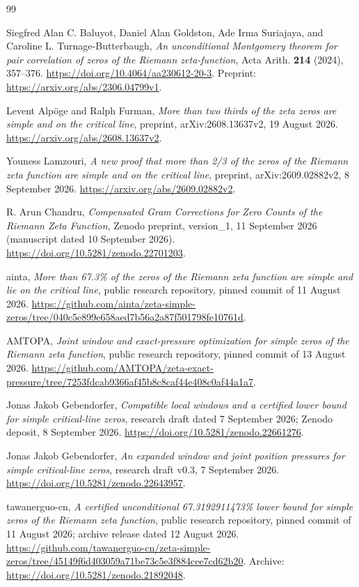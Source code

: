 \documentclass[11pt,reqno]{amsart}
\numberwithin{equation}{section}
\begin{document}
\begin{thebibliography}{99}
\raggedright

Siegfred Alan C. Baluyot, Daniel Alan Goldston, Ade Irma Suriajaya,
and Caroline L. Turnage-Butterbaugh,
\emph{An unconditional Montgomery theorem for pair correlation of zeros
of the Riemann zeta-function},
Acta Arith. \textbf{214} (2024), 357--376.
\url{https://doi.org/10.4064/aa230612-20-3}.
Preprint: \url{https://arxiv.org/abs/2306.04799v1}.

Levent Alp\"oge and Ralph Furman,
\emph{More than two thirds of the zeta zeros are simple and on the critical line},
preprint, arXiv:2608.13637v2, 19 August 2026.
\url{https://arxiv.org/abs/2608.13637v2}.

Youness Lamzouri,
\emph{A new proof that more than 2/3 of the zeros of the Riemann zeta
function are simple and on the critical line},
preprint, arXiv:2609.02882v2, 8 September 2026.
\url{https://arxiv.org/abs/2609.02882v2}.

R. Arun Chandru,
\emph{Compensated Gram Corrections for Zero Counts of the Riemann Zeta Function},
Zenodo preprint, version\_1, 11 September 2026
(manuscript dated 10 September 2026).
\url{https://doi.org/10.5281/zenodo.22701203}.

ainta,
\emph{More than 67.3\% of the zeros of the Riemann zeta function
are simple and lie on the critical line},
public research repository, pinned commit of 11 August 2026.
\url{https://github.com/ainta/zeta-simple-zeros/tree/040c5e899e658aed7b56a2a87f501798fe10761d}.

AMTOPA,
\emph{Joint window and exact-pressure optimization for simple zeros
of the Riemann zeta function},
public research repository, pinned commit of 13 August 2026.
\url{https://github.com/AMTOPA/zeta-exact-pressure/tree/7253fdcab9366af45b8c8caf44e408c0af44a1a7}.

Jonas Jakob Gebendorfer,
\emph{Compatible local windows and a certified lower bound
for simple critical-line zeros},
research draft dated 7 September 2026; Zenodo deposit, 8 September 2026.
\url{https://doi.org/10.5281/zenodo.22661276}.

Jonas Jakob Gebendorfer,
\emph{An expanded window and joint position pressures
for simple critical-line zeros},
research draft v0.3, 7 September 2026.
\url{https://doi.org/10.5281/zenodo.22643957}.

tawanerguo-cn,
\emph{A certified unconditional 67.3192911473\% lower bound
for simple zeros of the Riemann zeta function},
public research repository, pinned commit of 11 August 2026;
archive release dated 12 August 2026.
\url{https://github.com/tawanerguo-cn/zeta-simple-zeros/tree/45149f6d403059a71be73c5e3f884cee7cd62b20}.
Archive: \url{https://doi.org/10.5281/zenodo.21892048}.


\end{thebibliography}
\end{document}
